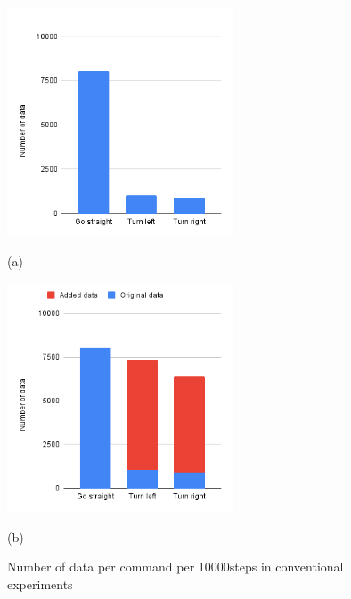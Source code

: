 \begin{figure}[h]
  \centering
  \begin{minipage}[b]{67mm}
    \centering
    \includegraphics[width=67mm]{images/hist_change_org.png}
    \caption*{(a)}
  \end{minipage} 
  \begin{minipage}[b]{67mm}
    \centering
    \includegraphics[width=67mm]{images/hist_change_times7.png}
    \caption*{(b)}
  \end{minipage}
  \caption{Number of data per command per 10000steps in conventional experiments}
  \label{Fig:hist}
\end{figure}

